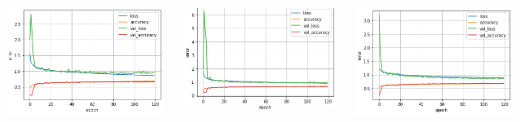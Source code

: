 \documentclass[25pt, a0paper, portrait]{tikzposter}
\begin{document}
\begin{columns}
{		\begin{minipage}[t]{.25\linewidth}
			\begin{tikzfigure}
				\label{no-global}
				\includegraphics[width=.8\linewidth]{figures/block_cnn.png}
			\end{tikzfigure}
		\end{minipage}
		\begin{minipage}[t]{.25\linewidth}
			\begin{tikzfigure}
				\label{global}
				\includegraphics[width=.8\linewidth]{figures/block_cnn_better.png}
			\end{tikzfigure}
		\end{minipage}
		\begin{minipage}[t]{.25\linewidth}
			\begin{tikzfigure}
				\label{global}
				\includegraphics[width=.84\linewidth]{figures/block_cnn_better_gamma.png}

\end{tikzfigure}
\end{minipage}}
\end{columns}
\end{document}
